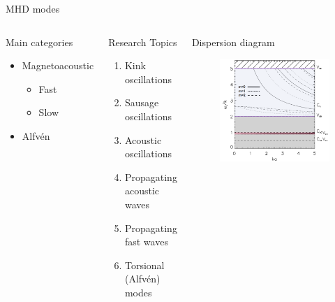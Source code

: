 \documentclass[11pt,table]{beamer}
\begin{document}
\begin{frame}{MHD modes}
    \begin{columns}
        \begin{block}{Main categories}
            \begin{itemize}
                \item Magnetoacoustic
                    \begin{itemize}
                        \item Fast %
                        \item Slow %
                    \end{itemize}
                \item Alfv\'en
            \end{itemize}
        \end{block}
        \begin{block}{Research Topics}
            \begin{enumerate}
                \item Kink oscillations
                \item Sausage oscillations
                \item Acoustic oscillations
                \item Propagating acoustic waves
                \item Propagating fast waves
                \item Torsional (Alfv\'en) modes
            \end{enumerate}
        \end{block}
        \begin{block}{\centering Dispersion diagram}
        \begin{figure}
            \includegraphics[width=\textwidth]{disp_diagram.png}

\end{figure}
\end{block}
\end{columns}
\end{frame}
\end{document}
